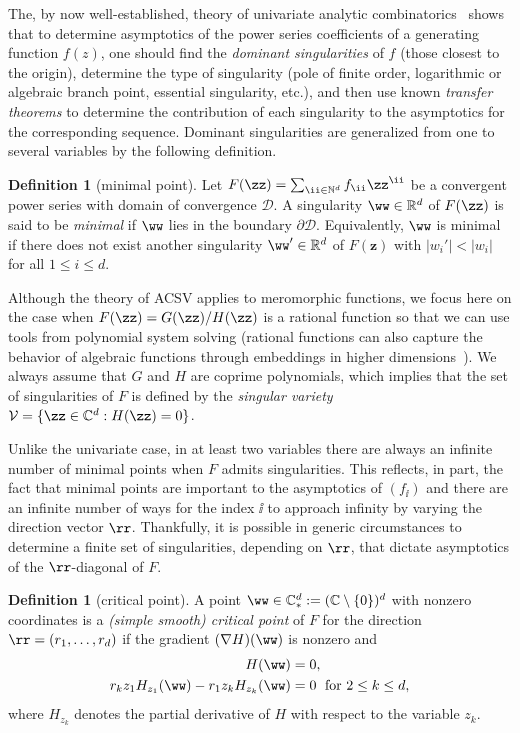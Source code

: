 \documentclass[a4paper]{amsart}
\theoremstyle{definition}
\newtheorem{definition}[theorem]{Definition}
\newcommand{\C}{{\mathbb C}}
\newcommand{\R}{{\mathbb R}}
\newcommand{\N}{{\mathbb N}}
\newcommand{\dom}{\mathcal{D}}
\newcommand{\sing}{\mathcal{V}}
\begin{document}
The, by now well-established, theory of univariate analytic combinatorics~\cite{FlajoletSedgewick2009} shows that to determine asymptotics of the power series coefficients of a generating function $f(z)$, one should find the \emph{dominant singularities} of $f$ (those closest to the origin), determine the type of singularity (pole of finite order, logarithmic or algebraic branch point, essential singularity, etc.), and then use known \emph{transfer theorems} to determine the contribution of each singularity to the asymptotics for the corresponding sequence. Dominant singularities are generalized from one to several variables by the following definition.

\begin{definition}[minimal point]
Let $F(\zz) = \sum_{\ii\in\N^d}f_\ii\zz^\ii$ be a convergent power series with domain of convergence $\dom$. A singularity $\ww\in\R^d$ of $F(\zz)$ is said to be \emph{minimal} if $\ww$ lies in the boundary $\partial \dom$. Equivalently, $\ww$ is minimal if there does not exist another singularity $\ww' \in \R^d$ of $F(\bm{z})$ with $|w_i'| < |w_i|$ for all $1 \le i \le d$.
\end{definition}

Although the theory of ACSV applies to meromorphic functions, we focus here on the case when $F(\zz)=G(\zz)/H(\zz)$ is a rational function so that we can use tools from polynomial system solving (rational functions can also capture the behavior of algebraic functions through embeddings in higher dimensions~\cite{GreenwoodMelczerRuzaWilson2022}). We always assume that $G$ and $H$ are coprime polynomials, which implies that the set of singularities of $F$ is defined by the \emph{singular variety} $\sing = \{\zz\in\C^d : H(\zz)=0\}$.

Unlike the univariate case, in at least two variables there are always an infinite number of minimal points when $F$ admits singularities. This reflects, in part, the fact that minimal points are important to the asymptotics of $(f_\ii)$ and there are an infinite number of ways for the index $\ii$ to approach infinity by varying the direction vector $\rr$. Thankfully, it is possible in generic circumstances to determine a finite set of singularities, depending on $\rr$, that dictate asymptotics of the $\rr$-diagonal of $F$.

\begin{definition}[critical point]
A point $\ww \in \C_*^d := (\C\setminus \{0\})^d$ with nonzero coordinates is a \emph{(simple smooth) critical point} of $F$ for the direction $\rr=(r_1,\dots,r_d)$ if the gradient $(\nabla H)(\ww)$ is nonzero and
\begin{align}
 \begin{split}
    H(\ww)&=0,\\
    r_kz_1H_{z_1}(\ww) - r_1z_kH_{z_k}(\ww) &= 0 \; \text{ for } 2\leq k\leq d,
    \end{split}  \label{eq:CP}
\end{align}
where $H_{z_k}$ denotes the partial derivative of $H$ with respect to the variable $z_k$.
\end{definition}
\end{document}
